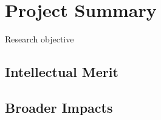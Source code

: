 \section{Project Summary}

Research objective

\subsection{Intellectual Merit}

\subsection{Broader Impacts}
  
  
  
  